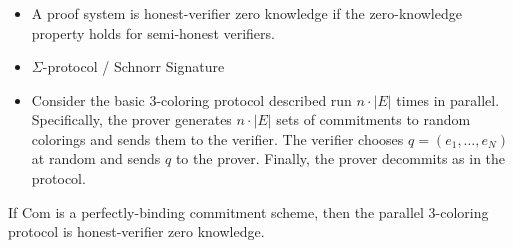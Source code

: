 \documentclass{beamer}
\begin{document}
    \begin{frame}
        \frametitle{}
    
        \begin{itemize}
            \item A proof system is honest-verifier zero knowledge if the zero-knowledge property holds for semi-honest verifiers. 
            \item $\Sigma$-protocol / Schnorr Signature
            \item Consider the basic 3-coloring protocol described  run $n \cdot|E|$ times in parallel. Specifically, the prover generates $n \cdot|E|$ sets of commitments to random colorings and sends them to the verifier. The verifier chooses $q=\left(e_{1}, \ldots, e_{N}\right)$ at random and sends $q$ to the prover. Finally, the prover decommits as in the protocol.
        \end{itemize}

        \begin{theorem}
             If $\mathrm{Com}$ is a perfectly-binding commitment scheme, then the parallel 3-coloring protocol is honest-verifier zero knowledge.
        \end{theorem}
    
    \end{frame}
\end{document}
